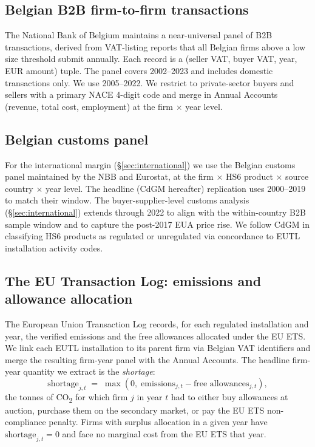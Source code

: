 \subsection{Belgian B2B firm-to-firm transactions}

The National Bank of Belgium maintains a near-universal panel of B2B transactions, derived from VAT-listing reports that all Belgian firms above a low size threshold submit annually. Each record is a (seller VAT, buyer VAT, year, EUR amount) tuple. The panel covers 2002--2023 and includes domestic transactions only. We use 2005--2022. We restrict to private-sector buyers and sellers with a primary NACE 4-digit code and merge in Annual Accounts (revenue, total cost, employment) at the firm $\times$ year level.

\subsection{Belgian customs panel}\label{sec:data_customs}

For the international margin (\S\ref{sec:international}) we use the Belgian customs panel maintained by the NBB and Eurostat, at the firm $\times$ HS6 product $\times$ source country $\times$ year level. The headline \citet{CosterMejeanDiGiovanni2024} (CdGM hereafter) replication uses 2000--2019 to match their window. The buyer-supplier-level customs analysis (\S\ref{sec:international}) extends through 2022 to align with the within-country B2B sample window and to capture the post-2017 EUA price rise. We follow CdGM in classifying HS6 products as regulated or unregulated via concordance to EUTL installation activity codes.

\subsection{The EU Transaction Log: emissions and allowance allocation}\label{sec:data_eutl}

The European Union Transaction Log records, for each regulated installation and year, the verified emissions and the free allowances allocated under the EU ETS. We link each EUTL installation to its parent firm via Belgian VAT identifiers and merge the resulting firm-year panel with the Annual Accounts. The headline firm-year quantity we extract is the \emph{shortage}:
\begin{equation}
    \text{shortage}_{j,t} \;=\; \max\!\left(0,\; \text{emissions}_{j,t} - \text{free allowances}_{j,t}\right),
    \label{eq:shortage}
\end{equation}
the tonnes of CO\textsubscript{2} for which firm $j$ in year $t$ had to either buy allowances at auction, purchase them on the secondary market, or pay the EU ETS non-compliance penalty. Firms with surplus allocation in a given year have $\text{shortage}_{j,t} = 0$ and face no marginal cost from the EU ETS that year.

